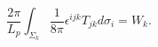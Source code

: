\begin{equation}
\frac{2\pi }{L_p}\int_{\Sigma _k}\frac 1{8\pi }\epsilon ^{ijk}T_{jk}d\sigma
_i=W_k.
\end{equation}

